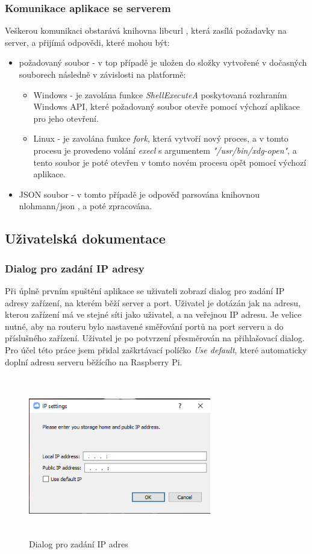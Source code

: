 \documentclass[
  glossaries,
]{kidiplom}
\begin{document}
\subsubsection{Komunikace aplikace se serverem}
Veškerou komunikaci obstarává knihovna libcurl \cite{LIBCURL}, která zasílá požadavky na server, a přijímá odpovědi, které mohou být:
\begin{itemize}
	\item požadovaný soubor - v top případě je uložen do složky vytvořené v dočasných souborech následně v závislosti na platformě:
	\begin{itemize}
	\item Windows - je zavolána funkce \textit {ShellExecuteA} poskytovaná rozhraním Windows API, které požadovaný soubor otevře pomocí výchozí aplikace pro jeho otevření.
	\item Linux - je zavolána funkce \textit{fork}, která vytvoří nový proces, a v tomto procesu je provedeno volání \textit{execl} s argumentem \textit{"/usr/bin/xdg-open"}, a tento soubor je poté otevřen v tomto novém procesu opět pomocí výchozí aplikace.
	\end{itemize}
	\item JSON soubor - v tomto případě je odpověď parsována knihovnou nlohmann/json \cite{JSONCPP}, a poté zpracována.
\end{itemize}
\subsection{Uživatelská dokumentace}
\subsubsection{Dialog pro zadání IP adresy}
Při úplně prvním spuštění aplikace se uživateli zobrazí dialog pro zadání IP adresy zařízení, na kterém běží server a port. Uživatel je dotázán jak na adresu, kterou zařízení má ve stejné síti jako uživatel, a na veřejnou IP adresu. Je velice nutné, aby na routeru bylo nastavené směřování portů na port serveru a do příslušného zařízení. Uživatel je po potvrzení přesměrován na přihlašovací dialog. Pro účel této práce jsem přidal zaškrtávací políčko \textit{Use default}, které automaticky doplní adresu serveru běžícího na Raspberry Pi.
\begin{figure}[htp]
    \centering
    \includegraphics[width=8cm,height=7cm,keepaspectratio]{ip}
    \caption{Dialog pro zadání IP adres}
    \label{fig:ip}
\end{figure}
\end{document}
